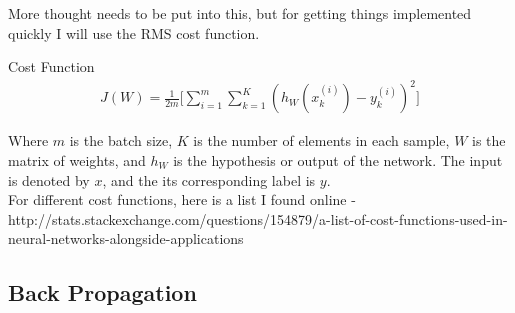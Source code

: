 \documentclass{article}
\begin{document}
More thought needs to be put into this, but for getting things implemented quickly I will use the RMS cost function.

Cost Function
\begin{align}
J(W) = \frac{1}{2m} \bigg [\sum_{i=1}^m \sum_{k=1}^K (h_W(x_k^{(i)}) -y_k^{(i)})^2 \bigg ]
\end{align}

Where $m$ is the batch size, $K$ is the number of elements in each sample, $W$ is the matrix of weights, and $h_W$ is the hypothesis or output of the network. The input is denoted by $x$, and the its corresponding label is $y$. \\

For different cost functions, here is a list I found online - http://stats.stackexchange.com/questions/154879/a-list-of-cost-functions-used-in-neural-networks-alongside-applications

\subsection{Back Propagation}
\end{document}
